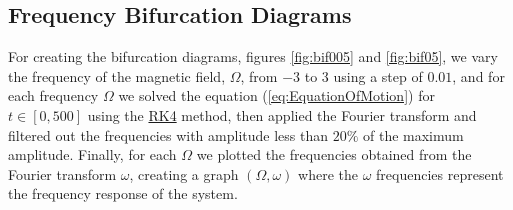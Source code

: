 \subsection{Frequency Bifurcation Diagrams}

For creating the bifurcation diagrams, figures \ref{fig:bif005} and \ref{fig:bif05}, we vary the frequency of the magnetic field, $\Omega$, from $-3$ to $3$ using a step of $0.01$, and for each frequency $\Omega$ we solved the equation (\ref{eq:EquationOfMotion}) for $t \in [0,500]$ using the \hyperref[sec:RK4]{RK4} method, then applied the Fourier transform and filtered out the frequencies with amplitude less than $20\%$ of the maximum amplitude. Finally, for each $\Omega$ we plotted the frequencies obtained from the Fourier transform $\omega$, creating a graph $(\Omega,\omega)$ where the $\omega$ frequencies represent the frequency response of the system.  

